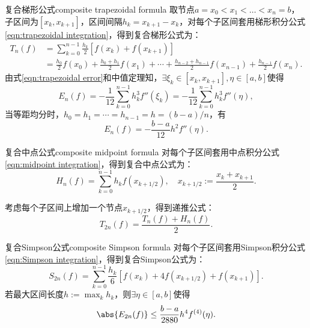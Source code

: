 \begin{example}
    {复合梯形公式}{composite trapezoidal formula}
    取节点$a=x_0<x_1<\ldots<x_n=b$，子区间为$[x_k,x_{k+1}]$，区间间隔$h_k=x_{k+1}-x_k$，对每个子区间套用梯形积分公式\eqref{eqn:trapezoidal integration}，得到复合梯形公式为：
    \begin{equation}
        \label{eqn:composite trapezoidal integration}
        \begin{aligned}
            T_n(f)&=\sum_{k=0}^{n-1}\frac{h_k}2[f(x_k)+f(x_{k+1})]\\
            &=\frac{h_0}2f(x_0)+\frac{h_0+h_1}2f(x_1)+\cdots+\frac{h_{n-2}+h_{n-1}}2f(x_{n-1})+\frac{h_{n-1}}2f(x_n).
        \end{aligned}
    \end{equation}
    由式\eqref{eqn:trapezoidal error}和中值定理知，$\exists\xi_k\in[x_k,x_{k+1}],\eta\in[a,b]$使得
    \begin{equation}
        E_n(f)=-\frac1{12}\sum_{k=0}^{n-1}h_k^3f''(\xi_k)=-\frac1{12}\sum_{k=0}^{n-1}h_k^3f''(\eta),
    \end{equation}
    当等距均分时，$h_0=h_1=\cdots=h_{n-1}=h=(b-a)/n$，有
    \begin{equation}
        E_n(f)=-\frac{b-a}{12}h^2f''(\eta).
    \end{equation}
\end{example}

\begin{example}
    {复合中点公式}{composite midpoint formula}
    对每个子区间套用中点积分公式\eqref{eqn:midpoint integration}，得到复合中点公式为：
    \begin{equation}
        H_n(f)=\sum_{k=0}^{n-1}h_kf(x_{k+1/2}),\quad x_{k+1/2}:=\frac{x_k+x_{k+1}}2.
    \end{equation}
\end{example}

\begin{corollary}
    考虑每个子区间上增加一个节点$x_{k+1/2}$，得到递推公式：
    \begin{equation}
        T_{2n}(f)=\frac{T_n(f)+H_n(f)}2.
    \end{equation}
\end{corollary}

\begin{example}
    {复合Simpson公式}{composite Simpson formula}
    对每个子区间套用Simpson积分公式\eqref{eqn:Simpson integration}，得到复合Simpson公式为：
    \begin{equation}
        S_{2n}(f)=\sum_{k=0}^{n-1}\frac{h_k}6[f(x_k)+4f(x_{k+1/2})+f(x_{k+1})].
    \end{equation}
    若最大区间长度$h:=\max_kh_k$，则$\exists\eta\in[a,b]$使得
    \begin{equation}
        \abs{E_{2n}(f)}\leq\frac{b-a}{2880}h^4f^{(4)}(\eta).
    \end{equation}
\end{example}

